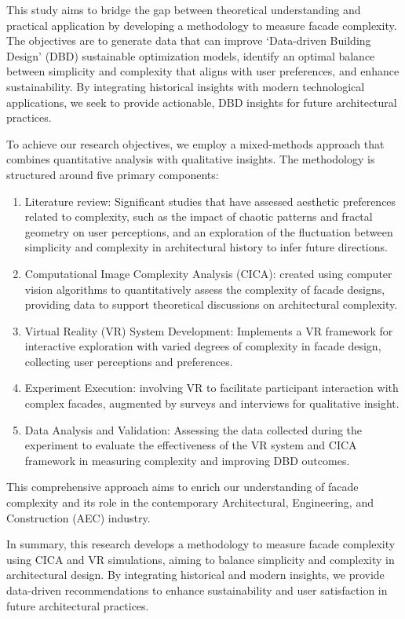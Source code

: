This study aims to bridge the gap between theoretical understanding and practical application by developing a methodology to measure facade complexity.
The objectives are to generate data that can improve `Data-driven Building Design' (DBD) sustainable optimization models, identify an optimal balance between simplicity and complexity that aligns with user preferences, and enhance sustainability.
By integrating historical insights with modern technological applications, we seek to provide actionable, DBD insights for future architectural practices.

To achieve our research objectives, we employ a mixed-methods approach that combines quantitative analysis with qualitative insights.
The methodology is structured around five primary components:

\begin{enumerate}
    \item Literature review: Significant studies that have assessed aesthetic preferences related to complexity, such as the impact of chaotic patterns and fractal geometry on user perceptions, and an exploration of the fluctuation between simplicity and complexity in architectural history to infer future directions.
    \item Computational Image Complexity Analysis (CICA): created using computer vision algorithms to quantitatively assess the complexity of facade designs, providing data to support theoretical discussions on architectural complexity.
    \item Virtual Reality (VR) System Development: Implements a VR framework for interactive exploration with varied degrees of complexity in facade design, collecting user perceptions and preferences.
    \item Experiment Execution: involving VR to facilitate participant interaction with complex facades, augmented by surveys and interviews for qualitative insight.
    \item Data Analysis and Validation: Assessing the data collected during the experiment to evaluate the effectiveness of the VR system and CICA framework in measuring complexity and improving DBD outcomes.

\end{enumerate}

This comprehensive approach aims to enrich our understanding of facade complexity and its role in the contemporary Architectural, Engineering, and Construction (AEC) industry.

In summary, this research develops a methodology to measure facade complexity using CICA and VR simulations, aiming to balance simplicity and complexity in architectural design.
 By integrating historical and modern insights, we provide data-driven recommendations to enhance sustainability and user satisfaction in future architectural practices.





%
